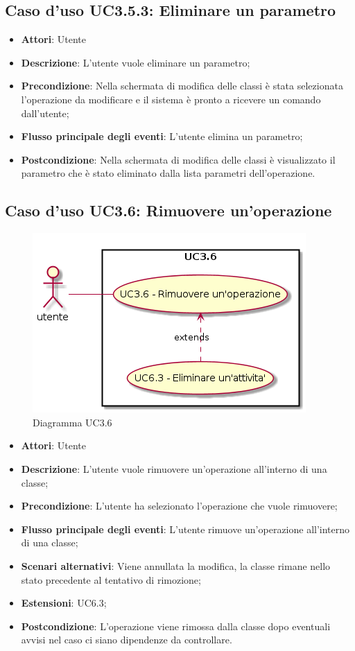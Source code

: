 \documentclass[../AnalisiDeiRequisiti.tex]{subfiles}
\begin{document}
			\subsection{Caso d'uso UC3.5.3: Eliminare un parametro}
			\begin{itemize}
				\item \textbf{Attori}: Utente
				\item \textbf{Descrizione}: L'utente vuole eliminare un parametro;
				\item \textbf{Precondizione}: Nella schermata di modifica delle classi è stata selezionata l'operazione da modificare e il sistema è pronto a ricevere un comando dall'utente;
				\item \textbf{Flusso principale degli eventi}: L'utente elimina un parametro;
				\item \textbf{Postcondizione}: Nella schermata di modifica delle classi è visualizzato il parametro che è stato eliminato dalla lista parametri dell'operazione.
			\end{itemize}
			\subsection{Caso d'uso UC3.6: Rimuovere un'operazione}
			\begin{figure} [H]
				\centering
				\includegraphics[scale=0.45]{./Figures/UC3_6.png}
				\caption{Diagramma UC3.6}\label{}
			\end{figure}
			\begin{itemize}
				\item \textbf{Attori}: Utente
				\item \textbf{Descrizione}: L'utente vuole rimuovere un'operazione all'interno di una classe;
				\item \textbf{Precondizione}: L'utente ha selezionato l'operazione che vuole rimuovere;
				\item \textbf{Flusso principale degli eventi}: L'utente rimuove un'operazione all'interno di una classe;
				\item \textbf{Scenari alternativi}: Viene annullata la modifica, la classe rimane nello stato precedente al tentativo di rimozione;
				\item \textbf{Estensioni}: UC6.3;
				\item \textbf{Postcondizione}: L'operazione viene rimossa dalla classe dopo eventuali avvisi nel caso ci siano dipendenze da controllare.
			\end{itemize}
\end{document}
